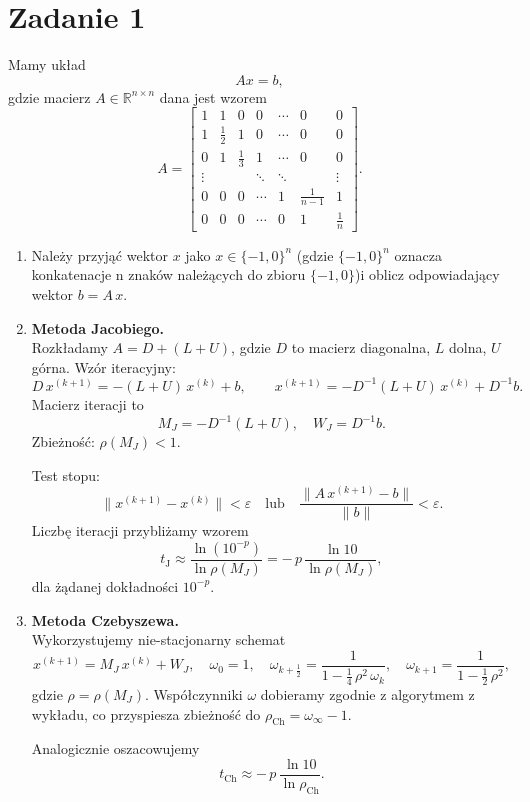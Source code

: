 \documentclass[a4paper,12pt]{article}
\begin{document}
\newpage
\section*{Zadanie 1}

Mamy układ
\[
A x = b,
\]
gdzie macierz \(A\in\mathbb{R}^{n\times n}\) dana jest wzorem
\[
A = 
\begin{bmatrix}
1      & 1      & 0      & 0      & \cdots & 0      & 0      \\
1      & \tfrac12 & 1      & 0      & \cdots & 0      & 0      \\
0      & 1      & \tfrac13 & 1      & \cdots & 0      & 0      \\
\vdots &        &        & \ddots & \ddots &        & \vdots \\
0      & 0      & 0      & \cdots & 1      & \tfrac{1}{n-1} & 1      \\
0      & 0      & 0      & \cdots & 0      & 1      & \tfrac1n
\end{bmatrix}.
\]
\begin{enumerate}
  \item Należy przyjąć wektor \(x\) jako $x \in \{-1,0\}^n$ (gdzie $\{-1,0\}^n$  oznacza konkatenacje n znaków należących do zbioru $\{-1,0
  \}$)i oblicz odpowiadający wektor \(b = A\,x\).
  
  \item \textbf{Metoda Jacobiego.} \\
    Rozkładamy \(A = D + (L+U)\), gdzie \(D\) to macierz diagonalna, \(L\) dolna, \(U\) górna. Wzór iteracyjny:
    \[
      D\,x^{(k+1)} = - (L + U)\,x^{(k)} + b,
      \qquad
      x^{(k+1)} = -D^{-1}(L+U)\,x^{(k)} + D^{-1}b.
    \]
    Macierz iteracji to
    \[
      M_J = -D^{-1}(L+U),
      \quad
      W_J = D^{-1}b.
    \]
    Zbieżność: \(\rho(M_J)<1\).
    
    Test stopu: 
    \[
      \|x^{(k+1)} - x^{(k)}\| < \varepsilon
      \quad\text{lub}\quad
      \frac{\|A\,x^{(k+1)} - b\|}{\|b\|} < \varepsilon.
    \]
    Liczbę iteracji przybliżamy wzorem
    \[
      t_{\mathrm{J}} \approx
      \frac{\ln(10^{-p})}{\ln\rho(M_J)}
      = -\,p\,\frac{\ln 10}{\ln\rho(M_J)},
    \]
    dla żądanej dokładności \(10^{-p}\).
  
  \item \textbf{Metoda Czebyszewa.} \\
    Wykorzystujemy nie-stacjonarny schemat
    \[
      x^{(k+1)} = M_J\,x^{(k)} + W_J,
      \quad
      \omega_0 = 1,
      \quad
      \omega_{k+\tfrac12}
        = \frac{1}{1 - \tfrac14\,\rho^2\,\omega_{k}},
      \quad
      \omega_{k+1}
        = \frac{1}{1 - \tfrac12\,\rho^2},
    \]
    gdzie \(\rho = \rho(M_J)\). 
    Współczynniki \(\omega\) dobieramy zgodnie z algorytmem z wykładu, co przyspiesza zbieżność do
    \(\displaystyle \rho_{\mathrm{Ch}} = \omega_\infty - 1\).
    
    Analogicznie oszacowujemy
    \[
      t_{\mathrm{Ch}} \approx
      -\,p\,\frac{\ln 10}{\ln\rho_{\mathrm{Ch}}}.
    \]
\end{enumerate}
\end{document}
